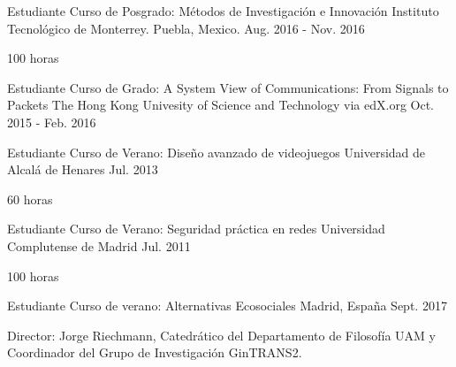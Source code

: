 \begin{cventries}
  \cventry
    {Estudiante} %
    {Curso de Posgrado: Métodos de Investigación e Innovación} %
    {Instituto Tecnológico de Monterrey. Puebla, Mexico.} %
    {Aug. 2016 - Nov. 2016} %
    {
      \begin{cvitems} %
        \item {100 horas}
      \end{cvitems}
    }

  \cventry
    {Estudiante} %
    {Curso de Grado: A System View of Communications: From Signals to Packets} %
    {The Hong Kong Univesity of Science and Technology via edX.org} %
    {Oct. 2015 - Feb. 2016} %
    {
    }

  \cventry
    {Estudiante} %
    {Curso de Verano: Diseño avanzado de videojuegos} %
    {Universidad de Alcalá de Henares} %
    {Jul. 2013} %
    {
      \begin{cvitems} %
        \item {60 horas}
      \end{cvitems}
    }
    
  \cventry
    {Estudiante} %
    {Curso de Verano: Seguridad práctica en redes} %
    {Universidad Complutense de Madrid} %
    {Jul. 2011} %
    {
      \begin{cvitems} %
        \item {100 horas}
      \end{cvitems}
    }
    
  \cventry
    {Estudiante} %
    {Curso de verano: Alternativas Ecosociales} %
    {Madrid, España} %
    {Sept. 2017} %
    {
      \begin{cvitems} %
        \item {Director: Jorge Riechmann, Catedrático del Departamento de Filosofía UAM y Coordinador del Grupo de Investigación GinTRANS2.}
      \end{cvitems}
    }

\end{cventries}

